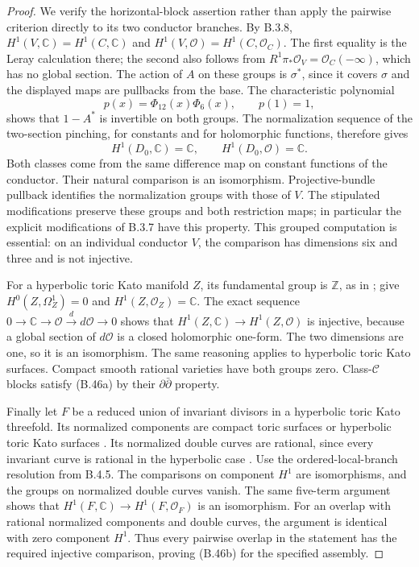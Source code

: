 \begin{proof}
We verify the horizontal-block assertion rather than
apply the pairwise criterion directly to its two
conductor branches. By B.3.8,
$H^1(V,\mathbb C)=H^1(C,\mathbb C)$ and
$H^1(V,\mathcal O)=H^1(C,\mathcal O_C)$.
The first equality is the Leray calculation there;
the second also follows from
$R^1\pi_*\mathcal O_V=\mathcal O_C(-\infty)$,
which has no global section. The action of $A$ on
these groups is $\sigma^*$, since it covers $\sigma$
and the displayed maps are pullbacks from the base.
The characteristic polynomial
\[
 p(x)=\Phi_{12}(x)\Phi_6(x),\qquad p(1)=1,
\]
shows that $1-A^*$ is invertible on both groups.
The normalization sequence of the two-section
pinching, for constants and for holomorphic
functions, therefore gives
\[
 H^1(D_0,\mathbb C)=\mathbb C,
 \qquad H^1(D_0,\mathcal O)=\mathbb C.
\]
Both classes come from the same difference map on
constant functions of the conductor. Their natural
comparison is an isomorphism. Projective-bundle
pullback identifies the normalization groups with
those of $V$. The stipulated modifications preserve
these groups and both restriction maps; in particular
the explicit modifications of B.3.7 have this property.
This grouped computation is essential: on an individual
conductor $V$, the comparison has dimensions six and
three and is not injective.

For a hyperbolic toric Kato manifold $Z$, its
fundamental group is $\mathbb Z$, as in
\cite[Section 2, p.1352]{IstratiEtAl2022Root};
\cite[Proposition 8.4 and Theorem 8.5]{IstratiEtAl2022Root}
give $H^0(Z,\Omega_Z^1)=0$ and
$H^1(Z,\mathcal O_Z)=\mathbb C$.
The exact sequence
$0\to\mathbb C\to\mathcal O\xrightarrow{d}d\mathcal O\to0$
shows that $H^1(Z,\mathbb C)\to H^1(Z,\mathcal O)$
is injective, because a global section of
$d\mathcal O$ is a closed holomorphic one-form.
The two dimensions are one, so it is an isomorphism.
The same reasoning applies to hyperbolic toric Kato
surfaces. Compact smooth rational varieties have
both groups zero. Class-$\mathcal C$ blocks satisfy
(B.46a) by their $\partial\bar\partial$ property.

Finally let $F$ be a reduced union of invariant
divisors in a hyperbolic toric Kato threefold.
Its normalized components are compact toric surfaces
or hyperbolic toric Kato surfaces
\cite[proof of Theorem 8.8, p.1380]{IstratiEtAl2022Root}.
Its normalized double curves are rational, since
every invariant curve is rational in the hyperbolic
case \cite[Theorem 5.2]{IstratiEtAl2022Root}.
Use the ordered-local-branch resolution from B.4.5.
The comparisons on component $H^1$ are isomorphisms,
and the groups on normalized double curves vanish.
The same five-term argument shows that
$H^1(F,\mathbb C)\to H^1(F,\mathcal O_F)$ is an
isomorphism. For an overlap with rational normalized
components and double curves, the argument is
identical with zero component $H^1$. Thus every
pairwise overlap in the statement has the required
injective comparison, proving (B.46b) for the
specified assembly.


\end{proof}
